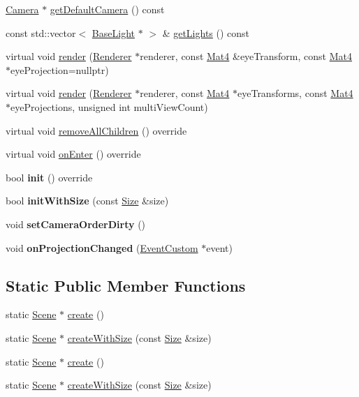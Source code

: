 \begin{DoxyCompactItemize}
\item 
\hyperlink{classCamera}{Camera} $\ast$ \hyperlink{classScene_a3c0cfe939da06f1ffe9a5ad9914bbde4}{get\+Default\+Camera} () const
\item 
const std\+::vector$<$ \hyperlink{classBaseLight}{Base\+Light} $\ast$ $>$ \& \hyperlink{classScene_abf8fbf57b95e05400254effb2f057125}{get\+Lights} () const
\item 
virtual void \hyperlink{classScene_a084f0a984d5bba3602bd35f785fa3929}{render} (\hyperlink{classRenderer}{Renderer} $\ast$renderer, const \hyperlink{classMat4}{Mat4} \&eye\+Transform, const \hyperlink{classMat4}{Mat4} $\ast$eye\+Projection=nullptr)
\item 
virtual void \hyperlink{classScene_aced683107a4ce95e8cc437f8d3914d1e}{render} (\hyperlink{classRenderer}{Renderer} $\ast$renderer, const \hyperlink{classMat4}{Mat4} $\ast$eye\+Transforms, const \hyperlink{classMat4}{Mat4} $\ast$eye\+Projections, unsigned int multi\+View\+Count)
\item 
virtual void \hyperlink{classScene_af55bdd0731d6ccfdd1c95c4011451adb}{remove\+All\+Children} () override
\item 
virtual void \hyperlink{classScene_a0f685cac49f90456c69f1b03aa5c8674}{on\+Enter} () override
\item 
\mbox{\label{classScene_a5afe475d025de4afd4ae430a49cfa8f8}} 
bool {\bfseries init} () override
\item 
\mbox{\label{classScene_a37d7ad2f2d3aafd5ca5b82cf25acb694}} 
bool {\bfseries init\+With\+Size} (const \hyperlink{classSize}{Size} \&size)
\item 
\mbox{\label{classScene_ad0d85e1b04419e7bc8f9c12aa7a8fbc2}} 
void {\bfseries set\+Camera\+Order\+Dirty} ()
\item 
\mbox{\label{classScene_a10d4cc3da3ef635b4ad3e8889e7f317b}} 
void {\bfseries on\+Projection\+Changed} (\hyperlink{classEventCustom}{Event\+Custom} $\ast$event)
\end{DoxyCompactItemize}
\subsection*{Static Public Member Functions}
\begin{DoxyCompactItemize}
\item 
static \hyperlink{classScene}{Scene} $\ast$ \hyperlink{classScene_a49adab0d8120fd9232ab734a2343338c}{create} ()
\item 
static \hyperlink{classScene}{Scene} $\ast$ \hyperlink{classScene_a7fd7c626da47b96d4357466614285f48}{create\+With\+Size} (const \hyperlink{classSize}{Size} \&size)
\item 
static \hyperlink{classScene}{Scene} $\ast$ \hyperlink{classScene_a69bfc1e98a629a8433e1308eca39ff59}{create} ()
\item 
static \hyperlink{classScene}{Scene} $\ast$ \hyperlink{classScene_a755586699d886f1bc64e9d35eca863d3}{create\+With\+Size} (const \hyperlink{classSize}{Size} \&size)
\end{DoxyCompactItemize}
